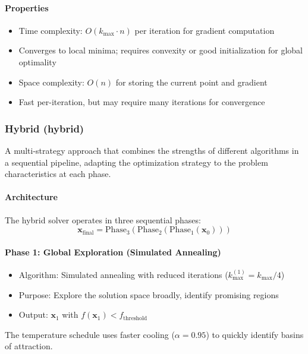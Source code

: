 \paragraph{Properties}
\begin{itemize}
\item Time complexity: $O(k_{\max} \cdot n)$ per iteration for gradient computation
\item Converges to local minima; requires convexity or good initialization for global optimality
\item Space complexity: $O(n)$ for storing the current point and gradient
\item Fast per-iteration, but may require many iterations for convergence
\end{itemize}

\subsubsection{Hybrid (hybrid)}
A multi-strategy approach that combines the strengths of different algorithms in a sequential pipeline, adapting the optimization strategy to the problem characteristics at each phase.

\paragraph{Architecture}
The hybrid solver operates in three sequential phases:
\begin{equation}
\mathbf{x}_{\text{final}} = \text{Phase}_3(\text{Phase}_2(\text{Phase}_1(\mathbf{x}_0)))
\end{equation}

\paragraph{Phase 1: Global Exploration (Simulated Annealing)}
\begin{itemize}
\item Algorithm: Simulated annealing with reduced iterations ($k_{\max}^{(1)} = k_{\max} / 4$)
\item Purpose: Explore the solution space broadly, identify promising regions
\item Output: $\mathbf{x}_1$ with $f(\mathbf{x}_1) < f_{\text{threshold}}$
\end{itemize}
The temperature schedule uses faster cooling ($\alpha = 0.95$) to quickly identify basins of attraction.

